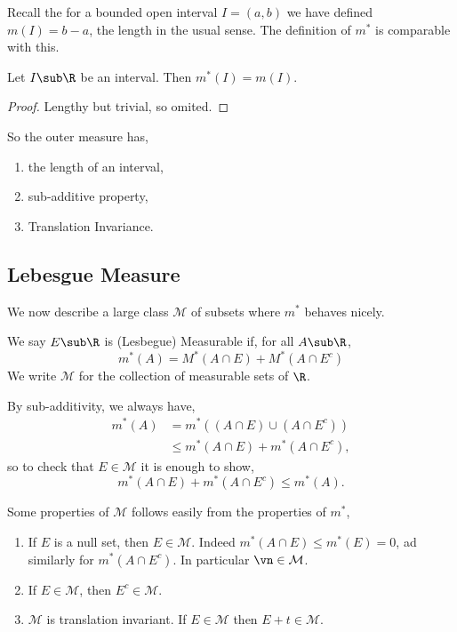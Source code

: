 \noindent
Recall the for a bounded open interval $I = (a, b)$ we have defined $m(I) = b - a$, the length in the usual sense. The definition of $m^*$ is comparable with this.

\begin{nlemma}
  Let $I \sub \R$ be an interval. Then $m^*(I) = m(I)$.
\end{nlemma}
\begin{proof}
  Lengthy but trivial, so omited.
\end{proof}

\noindent
So the outer measure has,
\begin{enumerate}
  \item the length of an interval,
  \item sub-additive property,
  \item Translation Invariance.
\end{enumerate}

\noindent
\subsection{Lebesgue Measure}
We now describe a large class $\mathcal{M}$ of subsets where $m^*$ behaves nicely.
\begin{ndefi}
  We say $E\sub \R$ is (Lesbegue) Measurable if, for all $A\sub \R$,
  $$ m^*(A) = M^*(A \cap E) + M^*(A\cap E^c) $$
  We write $\mathcal{M}$ for the collection of measurable sets of $\R$.
\end{ndefi}

\noindent
\begin{remark}
   By sub-additivity, we always have,
   \begin{align*}
     m^*(A) &= m^*((A\cap E) \cup (A\cap E^c))\\
     &\le m^*(A \cap E) + m^*(A \cap E^c),
   \end{align*}
   so to check that $E\in \mathcal{M}$ it is enough to show,
   $$ m^*(A\cap E) + m^*(A \cap E^c) \le m^*(A). $$
\end{remark}

\noindent
\begin{remark}
   Some properties of $\mathcal{M}$ follows easily from the properties of $m^*$,
   \begin{enumerate}
     \item If $E$ is a null set, then $E\in \mathcal{M}$. Indeed $m^*(A \cap E) \le m^*(E) = 0$, ad similarly for $m^*(A \cap E^c)$. In particular $\vn \in \mathcal{M}$.
     \item If $E \in \mathcal{M}$, then $E^c \in \mathcal{M}$.
     \item $\mathcal{M}$ is translation invariant. If $E\in \mathcal{M}$ then $E + t \in \mathcal{M}$.
   \end{enumerate}
\end{remark}

